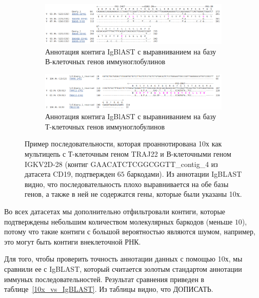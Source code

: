 \documentclass{spbau-diploma}
\begin{document}
\begin{figure}[h!]
  \centering
  \begin{subfigure}{\linewidth}
    \centering
    \includegraphics[width=1\textwidth]{figures/IgBLAST_bcr.png}
    \caption{Аннотация контига IgBlAST с выравниванием на базу В-клеточных генов иммуноглобулинов}
  \end{subfigure}

  \begin{subfigure}{\linewidth}
    \centering
    \includegraphics[width=1\textwidth]{figures/IgBLAST_tcr.png}
    \caption{Аннотация контига IgBlAST с выравниванием на базу Т-клеточных генов иммуноглобулинов}
  \end{subfigure}  
  \caption{Пример последовательности, которая проаннотирована 10х как мультицепь с Т-клеточным геном TRAJ22  и В-клеточными геном IGKV2D-28 (контиг GAACATCTCGGCGGTT\_contig\_4 из датасета CD19, подтвержден $65$ баркодами). Из аннотации IgBLAST видно, что последовательность плохо выравнивается на обе базы генов, а также в ней не содержатся гены, которые были указаны 10х.} 
  \label{IgBLAST_multi}
\end{figure}  

Во всех датасетах мы дополнительно отфильтровали контиги, которые подтверждены небольшим количеством молекулярных баркодов (меньше $10$), потому что такие контиги с большой вероятностью являются шумом, например, это могут быть контиги внеклеточной РНК.

Для того, чтобы проверить точность аннотации данных с помощью 10х, мы сравнили ее с IgBLAST, который считается золотым стандартом аннотации иммуных последовательностей. Результат сравнения приведен в таблице~\ref{10x_vs_IgBLAST}. Из таблицы видно, что ДОПИСАТЬ.
\end{document}
